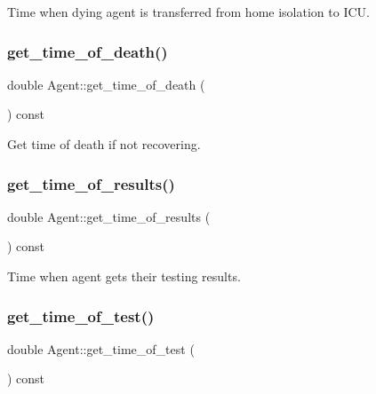 Time when dying agent is transferred from home isolation to I\+CU. 

\mbox{\label{classAgent_a8de09742703024f9974a3aaea17dc7ab}} 
\subsubsection{\texorpdfstring{get\+\_\+time\+\_\+of\+\_\+death()}{get\_time\_of\_death()}}
{\footnotesize\ttfamily double Agent\+::get\+\_\+time\+\_\+of\+\_\+death (\begin{DoxyParamCaption}{ }\end{DoxyParamCaption}) const\hspace{0.3cm}{\ttfamily [inline]}}



Get time of death if not recovering. 

\mbox{\label{classAgent_ae08afdbb10607a67d1b456e3660dc542}} 
\subsubsection{\texorpdfstring{get\+\_\+time\+\_\+of\+\_\+results()}{get\_time\_of\_results()}}
{\footnotesize\ttfamily double Agent\+::get\+\_\+time\+\_\+of\+\_\+results (\begin{DoxyParamCaption}{ }\end{DoxyParamCaption}) const\hspace{0.3cm}{\ttfamily [inline]}}



Time when agent gets their testing results. 

\mbox{\label{classAgent_a7f6b8aca348488cb00b0b4a5356be717}} 
\subsubsection{\texorpdfstring{get\+\_\+time\+\_\+of\+\_\+test()}{get\_time\_of\_test()}}
{\footnotesize\ttfamily double Agent\+::get\+\_\+time\+\_\+of\+\_\+test (\begin{DoxyParamCaption}{ }\end{DoxyParamCaption}) const\hspace{0.3cm}{\ttfamily [inline]}}



